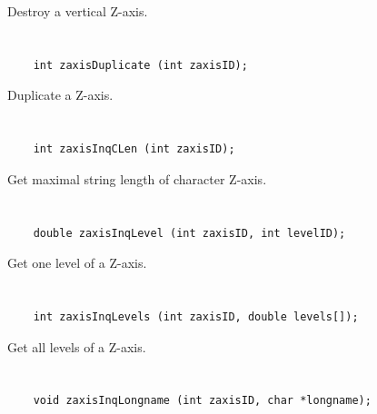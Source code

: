 Destroy a vertical Z-axis.


\section*{\tt {}}

\begin{verbatim}
    int zaxisDuplicate (int zaxisID);
\end{verbatim}

Duplicate a Z-axis.


\section*{\tt {}}

\begin{verbatim}
    int zaxisInqCLen (int zaxisID);
\end{verbatim}

Get maximal string length of character Z-axis.


\section*{\tt {}}

\begin{verbatim}
    double zaxisInqLevel (int zaxisID, int levelID);
\end{verbatim}

Get one level of a Z-axis.


\section*{\tt {}}

\begin{verbatim}
    int zaxisInqLevels (int zaxisID, double levels[]);
\end{verbatim}

Get all levels of a Z-axis.


\section*{\tt {}}

\begin{verbatim}
    void zaxisInqLongname (int zaxisID, char *longname);
\end{verbatim}

